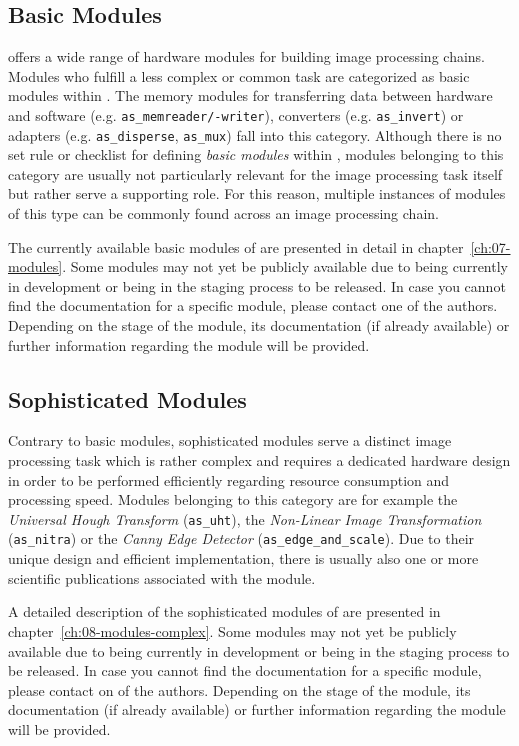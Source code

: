 \subsection{Basic Modules}
\asterics offers a wide range of hardware modules for building image processing chains. 
Modules who fulfill a less complex or common task are categorized as basic modules within \asterics. 
The memory modules for transferring data between hardware and software (e.g. \texttt{as\_memreader/-writer}), converters (e.g. \texttt{as\_invert}) or adapters (e.g. \texttt{as\_disperse}, \texttt{as\_mux}) fall into this category.
Although there is no set rule or checklist for defining \textit{basic modules} within \asterics, modules belonging to this category are usually not particularly relevant for the image processing task itself but rather serve a supporting role. 
For this reason, multiple instances of modules of this type can be commonly found across an image processing chain.

The currently available basic modules of \asterics are presented in detail in chapter~\ref{ch:07-modules}.
Some modules may not yet be publicly available due to being currently in development or being in the staging process to be released.
In case you cannot find the documentation for a specific module, please contact one of the authors.
Depending on the stage of the module, its documentation (if already available) or further information regarding the module will be provided.

\subsection{Sophisticated Modules}
Contrary to basic modules, sophisticated modules serve a distinct image processing task which is rather complex and requires a dedicated hardware design in order to be performed efficiently regarding resource consumption and processing speed.
Modules belonging to this category are for example the \textit{Universal Hough Transform} (\texttt{as\_uht}), the \textit{Non-Linear Image Transformation} (\texttt{as\_nitra}) or the \textit{Canny Edge Detector} (\texttt{as\_edge\_and\_scale}).
Due to their unique design and efficient implementation, there is usually also one or more scientific publications associated with the module. 

A detailed description of the sophisticated modules of \asterics are presented in chapter~\ref{ch:08-modules-complex}. 
Some modules may not yet be publicly available due to being currently in development or being in the staging process to be released.
In case you cannot find the documentation for a specific module, please contact on of the authors.
Depending on the stage of the module, its documentation (if already available) or further information regarding the module will be provided.

